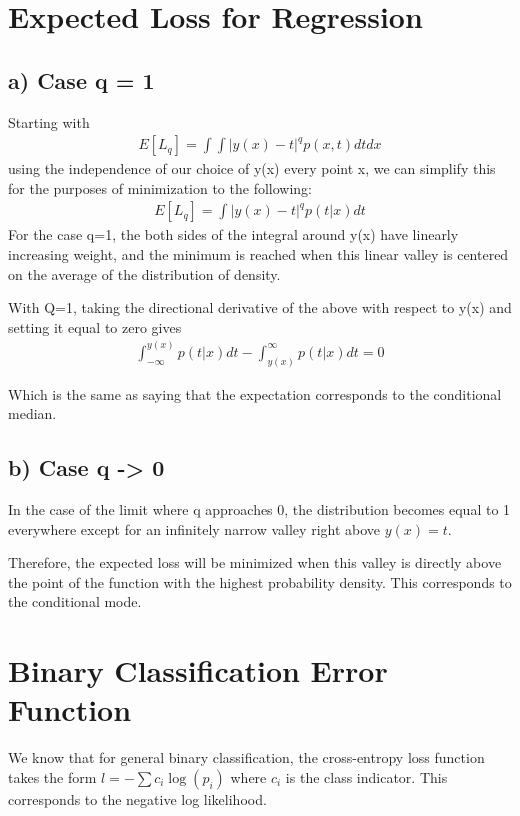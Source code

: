 \documentclass{article}
\begin{document}
\section{Expected Loss for Regression}

\subsection{a) Case q = 1}
Starting with 
\begin{gather}
E \left[ { L }_{ q } \right] =\int { \int { { |y(x) - t| }^{ q }p(x,t)dtdx }  } 
\end{gather}
using the independence of our choice of y(x) every point x, we can simplify this for the purposes of minimization to the following:
\begin{gather}
E \left[ { L }_{ q } \right] = \int { { |y(x) - t| }^{ q }p(t|x)dt }
\end{gather}
For the case q=1, the both sides of the integral around y(x) have linearly increasing weight, and the minimum is reached when this linear valley is centered on the average of the distribution of density.

With Q=1, taking the directional derivative of the above with respect to y(x) and setting it equal to zero gives
\begin{gather}
\int _{-\infty}^{y(x)} {p(t|x)dt } - \int _{y(x)}^{\infty} {p(t|x)dt } = 0
\end{gather}

Which is the same as saying that the expectation corresponds to the conditional median. 

\subsection{b) Case q -> 0}

In the case of the limit where q approaches 0, the distribution becomes equal to 1 everywhere except for an infinitely narrow valley right above $y(x)=t$.

Therefore, the expected loss will be minimized when this valley is directly above the point of the function with the highest probability density.  This corresponds to the conditional mode. 


\section{Binary Classification Error Function}

We know that for general binary classification, the cross-entropy loss function takes the form $l=-\sum c_i\log(p_i)$ where $c_i$ is the class indicator. This corresponds to the negative log likelihood. 
\end{document}
